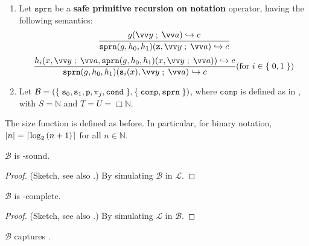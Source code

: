 \begin{definition}
\begin{enumerate}[label=(\arabic*)]
\item Let $\mathtt{sprn}$ be a \textbf{safe primitive recursion on notation}
operator, having the following semantics:\begin{align*}
%
\judgement{
%
  g\p{\vect{y} \semic{} \vect{a}} \goesto c
%
}{
%
  \mathtt{sprn}\p{g,h_0,h_1}\p{\mathtt{z}, \vect{y} \semic{} \vect{a}} \goesto
c
%
}\end{align*}\begin{align*}
%
\judgement{
%
  h_i\p{x, \vect{y} \semic{} \vect{a}, \mathtt{sprn}\p{g,h_0,h_1}\p{x,\vect{y}
\semic{} \vect{a}}} \goesto c
%
}{
%
  \mathtt{sprn}\p{g,h_0,h_1}\p{\mathtt{s}_i\p{x}, \vect{y} \semic{} \vect{a}}
\goesto c
%
}\p{\text{for $i\in\set{0,1}$}}
%
\end{align*}

\item Let $\mathcal{B} = {\mathopen{}\left({\mathopen{}\left\{\mathrel{}{\mathtt{s}_0, \mathtt{s}_1, \mathtt{p}, \pi_j,
\mathtt{cond}}\mathrel{}\right\}\mathclose{},\mathopen{}\left\{\mathrel{}{\mathtt{comp}, \mathtt{sprn}}\mathrel{}\right\}\mathclose{}}\right)\mathclose{}} $, where $\mathtt{comp}$ is
defined as in , with $S=\mathbb{N}$ and
$T=U=\Box\mathbb{N}$.

\end{enumerate}

\end{definition}

\begin{remark} The size function is defined as before. In particular, for
binary notation, ${\mathopen{}\left|{n}\right|\mathclose{}}=\mathopen{}\left\lceil{\log_2{\ensuremath{\mathopen{}\left({n+1}\right)\mathclose{}}}}\right\rceil\mathclose{}$ for all $n \in \mathbb{N}$.
\end{remark}

\begin{lemma} \label{lem:b-fptime-sound} $\mathcal{B}$ is \FPTIME{}-sound.
\end{lemma}

\begin{proof} (Sketch, see also \cite{bellantoni-cook-1992}.) By simulating
$\mathcal{B}$ in $\mathcal{L}$.   \end{proof}

\begin{lemma} \label{lem:b-fptime-complete} $\mathcal{B}$ is
\FPTIME{}-complete.  \end{lemma}

\begin{proof} (Sketch, see also \cite{bellantoni-cook-1992}.) By simulating
$\mathcal{L}$ in $\mathcal{B}$.  \end{proof}

\begin{theorem} $\mathcal{B}$ captures \FPTIME{}. \end{theorem}

